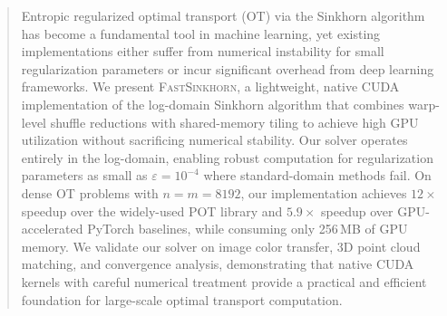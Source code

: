 
\begin{abstract}
Entropic regularized optimal transport (OT) via the Sinkhorn algorithm has become a fundamental tool in machine learning, yet existing implementations either suffer from numerical instability for small regularization parameters or incur significant overhead from deep learning frameworks. We present \textsc{FastSinkhorn}, a lightweight, native CUDA implementation of the log-domain Sinkhorn algorithm that combines warp-level shuffle reductions with shared-memory tiling to achieve high GPU utilization without sacrificing numerical stability. Our solver operates entirely in the log-domain, enabling robust computation for regularization parameters as small as $\varepsilon = 10^{-4}$ where standard-domain methods fail. On dense OT problems with $n = m = 8192$, our implementation achieves $12\times$ speedup over the widely-used POT library and $5.9\times$ speedup over GPU-accelerated PyTorch baselines, while consuming only 256\,MB of GPU memory. We validate our solver on image color transfer, 3D point cloud matching, and convergence analysis, demonstrating that native CUDA kernels with careful numerical treatment provide a practical and efficient foundation for large-scale optimal transport computation.
\end{abstract}
